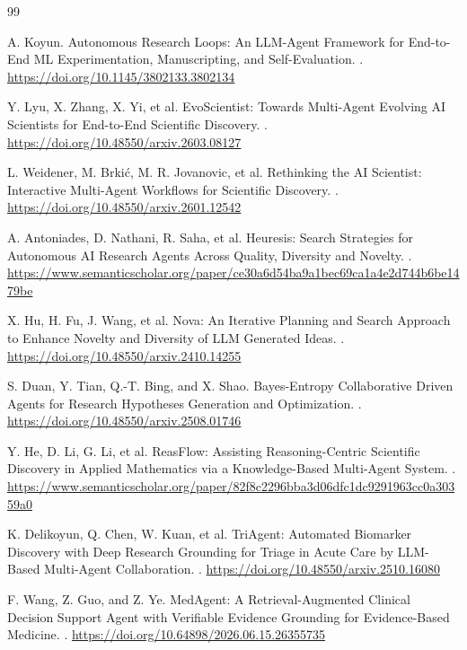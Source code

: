 \documentclass[11pt]{article}
\begin{document}
\begin{thebibliography}{99}

A. Koyun.
\newblock Autonomous Research Loops: An LLM-Agent Framework for End-to-End ML Experimentation, Manuscripting, and Self-Evaluation.
. \url{https://doi.org/10.1145/3802133.3802134}

Y. Lyu, X. Zhang, X. Yi, et al.
\newblock EvoScientist: Towards Multi-Agent Evolving AI Scientists for End-to-End Scientific Discovery.
. \url{https://doi.org/10.48550/arxiv.2603.08127}

L. Weidener, M. Brki\'c, M. R. Jovanovic, et al.
\newblock Rethinking the AI Scientist: Interactive Multi-Agent Workflows for Scientific Discovery.
. \url{https://doi.org/10.48550/arxiv.2601.12542}

A. Antoniades, D. Nathani, R. Saha, et al.
\newblock Heuresis: Search Strategies for Autonomous AI Research Agents Across Quality, Diversity and Novelty.
. \url{https://www.semanticscholar.org/paper/ce30a6d54ba9a1bec69ca1a4e2d744b6be1479be}

X. Hu, H. Fu, J. Wang, et al.
\newblock Nova: An Iterative Planning and Search Approach to Enhance Novelty and Diversity of LLM Generated Ideas.
. \url{https://doi.org/10.48550/arxiv.2410.14255}

S. Duan, Y. Tian, Q.-T. Bing, and X. Shao.
\newblock Bayes-Entropy Collaborative Driven Agents for Research Hypotheses Generation and Optimization.
. \url{https://doi.org/10.48550/arxiv.2508.01746}

Y. He, D. Li, G. Li, et al.
\newblock ReasFlow: Assisting Reasoning-Centric Scientific Discovery in Applied Mathematics via a Knowledge-Based Multi-Agent System.
. \url{https://www.semanticscholar.org/paper/82f8c2296bba3d06dfc1dc9291963cc0a30359a0}

K. Delikoyun, Q. Chen, W. Kuan, et al.
\newblock TriAgent: Automated Biomarker Discovery with Deep Research Grounding for Triage in Acute Care by LLM-Based Multi-Agent Collaboration.
. \url{https://doi.org/10.48550/arxiv.2510.16080}

F. Wang, Z. Guo, and Z. Ye.
\newblock MedAgent: A Retrieval-Augmented Clinical Decision Support Agent with Verifiable Evidence Grounding for Evidence-Based Medicine.
. \url{https://doi.org/10.64898/2026.06.15.26355735}


\end{thebibliography}
\end{document}

